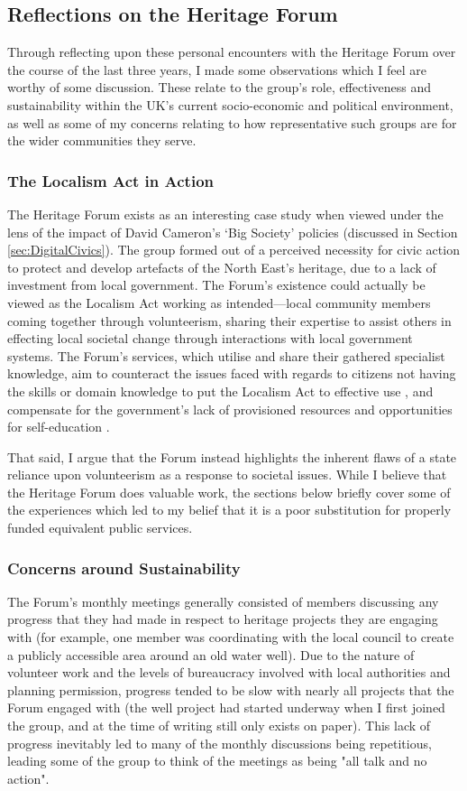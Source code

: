 \subsection{Reflections on the Heritage Forum}
Through reflecting upon these personal encounters with the Heritage Forum over the course of the last three years, I made some observations which I feel are worthy of some discussion. These relate to the group's role, effectiveness and sustainability within the UK's current socio-economic and political environment, as well as some of my concerns relating to how representative such groups are for the wider communities they serve.

\subsubsection{The Localism Act in Action}
The Heritage Forum exists as an interesting case study when viewed under the lens of the impact of David Cameron's `Big Society' policies (discussed in Section \ref{sec:DigitalCivics}). The group formed out of a perceived necessity for civic action to protect and develop artefacts of the North East's heritage, due to a lack of investment from local government. The Forum's existence could actually be viewed as the Localism Act working as intended---local community members coming together through volunteerism, sharing their expertise to assist others in effecting local societal change through interactions with local government systems. The Forum's services, which utilise and share their gathered specialist knowledge, aim to counteract the issues faced with regards to citizens not having the skills or domain knowledge to put the Localism Act to effective use \citep{BBCSundayPolitics2013}, and compensate for the government's lack of provisioned resources and opportunities for self-education \citep{BenRogers2010a}. 

That said, I argue that the Forum instead highlights the inherent flaws of a state reliance upon volunteerism as a response to societal issues. While I believe that the Heritage Forum does valuable work, the sections below briefly cover some of the experiences which led to my belief that it is a poor substitution for properly funded equivalent public services.

\subsubsection{Concerns around Sustainability}
The Forum's monthly meetings generally consisted of members discussing any progress that they had made in respect to heritage projects they are engaging with (for example, one member was coordinating with the local council to create a publicly accessible area around an old water well). Due to the nature of volunteer work and the levels of bureaucracy involved with local authorities and planning permission, progress tended to be slow with nearly all projects that the Forum engaged with (the well project had started underway when I first joined the group, and at the time of writing still only exists on paper). This lack of progress inevitably led to many of the monthly discussions being repetitious, leading some of the group to think of the meetings as being "all talk and no action".

